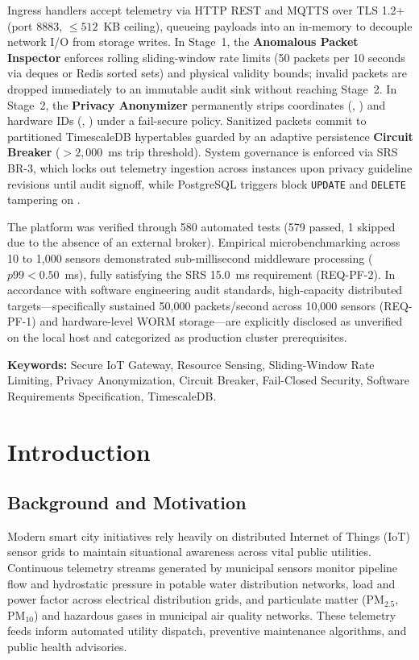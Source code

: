 \documentclass[a4paper]{article}
\begin{document}
Ingress handlers accept telemetry via HTTP REST and MQTTS over TLS 1.2+ (port 8883, $\le 512$~KB ceiling), queueing payloads into an in-memory  to decouple network I/O from storage writes. In Stage~1, the \textbf{Anomalous Packet Inspector} enforces rolling sliding-window rate limits (50 packets per 10 seconds via deques or Redis sorted sets) and physical validity bounds; invalid packets are dropped immediately to an immutable audit sink without reaching Stage~2. In Stage~2, the \textbf{Privacy Anonymizer} permanently strips coordinates (, ) and hardware IDs (, ) under a fail-secure policy. Sanitized packets commit to partitioned TimescaleDB hypertables guarded by an adaptive persistence \textbf{Circuit Breaker} ($> 2,000$~ms trip threshold). System governance is enforced via SRS BR-3, which locks out telemetry ingestion across instances upon privacy guideline revisions until audit signoff, while PostgreSQL triggers block \texttt{UPDATE} and \texttt{DELETE} tampering on .

The platform was verified through 580 automated tests (579 passed, 1 skipped due to the absence of an external broker). Empirical microbenchmarking across 10 to 1,000 sensors demonstrated sub-millisecond middleware processing ($p99 < 0.50$~ms), fully satisfying the SRS 15.0~ms requirement (REQ-PF-2). In accordance with software engineering audit standards, high-capacity distributed targets---specifically sustained 50,000 packets/second across 10,000 sensors (REQ-PF-1) and hardware-level WORM storage---are explicitly disclosed as unverified on the local host and categorized as production cluster prerequisites.

\vspace{0.8em}
\noindent\textbf{Keywords:} Secure IoT Gateway, Resource Sensing, Sliding-Window Rate Limiting, Privacy Anonymization, Circuit Breaker, Fail-Closed Security, Software Requirements Specification, TimescaleDB.
\clearpage
{}
\setcounter{page}{1}

\section{Introduction}

\subsection{Background and Motivation}
Modern smart city initiatives rely heavily on distributed Internet of Things (IoT) sensor grids to maintain situational awareness across vital public utilities. Continuous telemetry streams generated by municipal sensors monitor pipeline flow and hydrostatic pressure in potable water distribution networks, load and power factor across electrical distribution grids, and particulate matter ($\text{PM}_{2.5}$, $\text{PM}_{10}$) and hazardous gases in municipal air quality networks. These telemetry feeds inform automated utility dispatch, preventive maintenance algorithms, and public health advisories.
\end{document}
